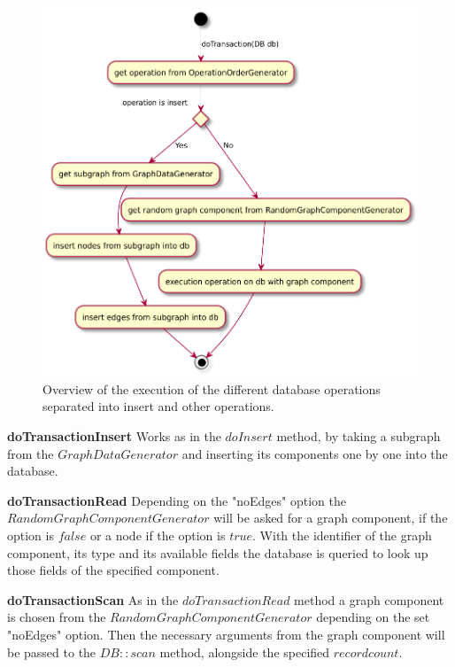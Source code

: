 \begin{figure}[h!]
  \includegraphics[width=\textwidth]{images/extensions/graphWorkloadExecution}
  \caption{Overview of the execution of the different database operations separated into insert and other operations.}
  \label{fig:graphWorkloadExecution}
\end{figure}

\textbf{doTransactionInsert} \newline
Works as in the $ doInsert $ method,
by taking a subgraph from the $ GraphDataGenerator $ and inserting its components one by one into the database.

\textbf{doTransactionRead}
Depending on the "noEdges" option the $ RandomGraphComponentGenerator $ will be asked for a graph component,
if the option is $ false $ or a node if the option is $ true $.
With the identifier of the graph component,
its type and its available fields the database is queried to look up those fields of the specified component.

\textbf{doTransactionScan} \newline
As in the $ doTransactionRead $ method a graph component is chosen from the $ RandomGraphComponentGenerator $ depending on the set "noEdges" option.
Then the necessary arguments from the graph component will be passed to the $ DB::scan $ method,
alongside the specified $ recordcount $.

